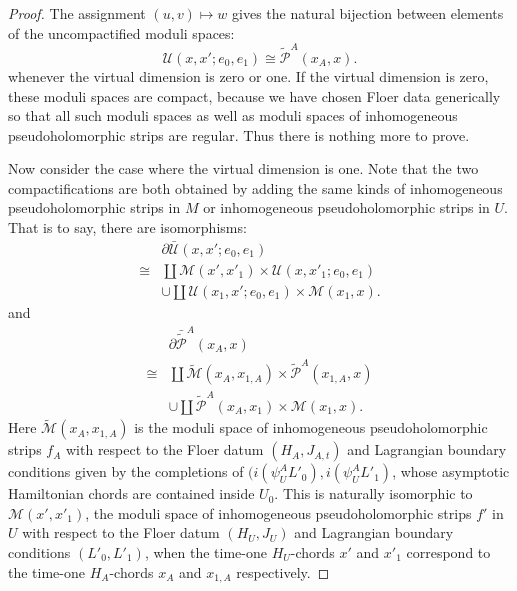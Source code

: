 \documentclass{amsart}
\numberwithin{equation}{section}
\numberwithin{figure}{section}
\begin{document}
\begin{proof}
	The assignment $(u, v) \mapsto w$ gives the natural bijection between elements of the uncompactified moduli spaces:
\begin{equation*}
\mathcal{U}(x, x'; e_{0}, e_{1}) \cong \tilde{\mathcal{P}}^{A}(x_{A}, x).
\end{equation*}
whenever the virtual dimension is zero or one.
If the virtual dimension is zero, these moduli spaces are compact, because we have chosen Floer data generically so that all such moduli spaces as well as moduli spaces of inhomogeneous pseudoholomorphic strips are regular. Thus there is nothing more to prove. \par
	Now consider the case where the virtual dimension is one. Note that the two compactifications are both obtained by adding the same kinds of inhomogeneous pseudoholomorphic strips in $M$ or inhomogeneous pseudoholomorphic strips in $U$. That is to say, there are isomorphisms:
\begin{equation*}
\begin{split}
& \partial \bar{\mathcal{U}}(x, x'; e_{0}, e_{1})\\
\cong & \coprod \mathcal{M}(x', x'_{1}) \times \mathcal{U}(x, x'_{1}; e_{0}, e_{1})\\
& \cup \coprod \mathcal{U}(x_{1}, x'; e_{0}, e_{1}) \times \mathcal{M}(x_{1}, x).
\end{split}
\end{equation*}
and
\begin{equation*}
\begin{split}
& \partial \bar{\tilde{\mathcal{P}}}^{A}(x_{A}, x)\\
\cong & \coprod \tilde{\mathcal{M}}(x_{A}, x_{1, A}) \times \tilde{\mathcal{P}}^{A}(x_{1, A}, x)\\
& \cup \coprod \tilde{\mathcal{P}}^{A}(x_{A}, x_{1}) \times \mathcal{M}(x_{1}, x).
\end{split}
\end{equation*}
Here $\tilde{\mathcal{M}}(x_{A}, x_{1, A})$ is the moduli space of inhomogeneous pseudoholomorphic strips $f_{A}$ with respect to the Floer datum $(H_{A}, J_{A, t})$ and Lagrangian boundary conditions given by the completions of $(i(\psi_{U}^{A} L'_{0}), i(\psi_{U}^{A} L'_{1})$, whose asymptotic Hamiltonian chords are contained inside $U_{0}$. This is naturally isomorphic to $\mathcal{M}(x', x'_{1})$, the moduli space of inhomogeneous pseudoholomorphic strips $f'$ in $U$ with respect to the Floer datum $(H_{U}, J_{U})$ and Lagrangian boundary conditions $(L'_{0}, L'_{1})$, when the time-one $H_{U}$-chords $x'$ and $x'_{1}$ correspond to the time-one $H_{A}$-chords $x_{A}$ and $x_{1, A}$ respectively.

\end{proof}
\end{document}
